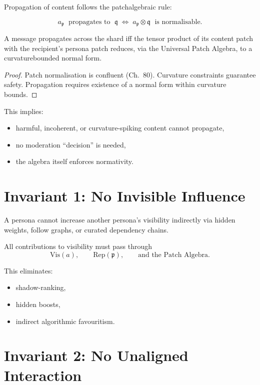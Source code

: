 Propagation of content follows the patch\textendash algebraic rule:

\[
a_{\mathfrak{p}} 
\;\text{ propagates to }\;
\mathfrak{q}
\;\iff\;
a_{\mathfrak{p}}
\otimes
\mathfrak{q}
\;\text{ is normalisable}.
\]

\begin{theorem}
A message propagates across the shard
iff the tensor product of its content patch with the recipient’s
persona patch reduces, via the Universal Patch Algebra,
to a curvature\textendash bounded normal form.
\end{theorem}

\begin{proof}
Patch normalisation is confluent (Ch.~80).
Curvature constraints guarantee safety.
Propagation requires existence of a normal form within curvature bounds.
\end{proof}

This implies:
\begin{itemize}
    \item harmful, incoherent, or curvature-spiking content cannot propagate,
    \item no moderation “decision” is needed,
    \item the algebra itself enforces normativity.
\end{itemize}

\section{Invariant 1: No Invisible Influence}

A persona cannot increase another persona’s visibility indirectly
via hidden weights, follow graphs, or curated dependency chains.

\begin{invariant}
All contributions to visibility must pass through
\[
\mathrm{Vis}(a),
\qquad
\mathrm{Rep}(\mathfrak{p}),
\qquad
\text{and the Patch Algebra}.
\]
\end{invariant}

This eliminates:
\begin{itemize}
    \item shadow-ranking,
    \item hidden boosts,
    \item indirect algorithmic favouritism.
\end{itemize}

\section{Invariant 2: No Unaligned Interaction}

